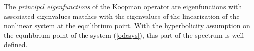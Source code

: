 \documentclass[11pt]{article}
\theoremstyle{plain}
\newtheorem{definition}[theorem]{Definition}
\newcommand{\cZ}{{\cal Z}}
\newcommand{\mN}{{\mathbb N}}
\newcommand{\mR}{{\mathbb R}}
\newcommand{\mU}{{\mathbb U}}
\newcommand{\bs}{{\mathbf s}}
\newcommand{\bk}{{\mathbf k}}
\newcommand{\bx}{{\mathbf x}}
\begin{document}
The {\it principal eigenfunctions} of the Koopman operator are eigenfunctions with asscoiated eigenvalues matches with the eigenvalues of the linearization of the nonlinear system at the equilibrium point. With the hyperbolicity assumption on the equilibrium point of the system (\ref{odesys}), this part of the spectrum is  well-defined. 
\end{document}
